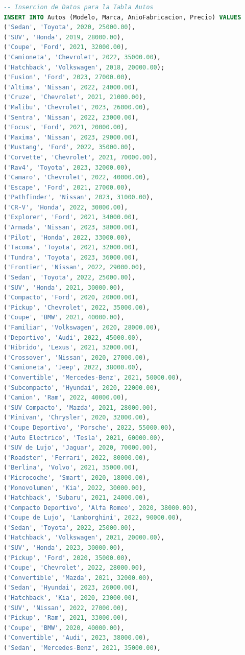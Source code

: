 \documentclass[12pt]{article}
\begin{document}
\begin{lstlisting}[language=SQL]
-- Insercion de Datos para la Tabla Autos
INSERT INTO Autos (Modelo, Marca, AnioFabricacion, Precio) VALUES
('Sedan', 'Toyota', 2020, 25000.00),
('SUV', 'Honda', 2019, 28000.00),
('Coupe', 'Ford', 2021, 32000.00),
('Camioneta', 'Chevrolet', 2022, 35000.00),
('Hatchback', 'Volkswagen', 2018, 20000.00);
('Fusion', 'Ford', 2023, 27000.00),
('Altima', 'Nissan', 2022, 24000.00),
('Cruze', 'Chevrolet', 2021, 21000.00),
('Malibu', 'Chevrolet', 2023, 26000.00),
('Sentra', 'Nissan', 2022, 23000.00),
('Focus', 'Ford', 2021, 20000.00),
('Maxima', 'Nissan', 2023, 29000.00),
('Mustang', 'Ford', 2022, 35000.00),
('Corvette', 'Chevrolet', 2021, 70000.00),
('Rav4', 'Toyota', 2023, 32000.00),
('Camaro', 'Chevrolet', 2022, 40000.00),
('Escape', 'Ford', 2021, 27000.00),
('Pathfinder', 'Nissan', 2023, 31000.00),
('CR-V', 'Honda', 2022, 30000.00),
('Explorer', 'Ford', 2021, 34000.00),
('Armada', 'Nissan', 2023, 38000.00),
('Pilot', 'Honda', 2022, 33000.00),
('Tacoma', 'Toyota', 2021, 32000.00),
('Tundra', 'Toyota', 2023, 36000.00),
('Frontier', 'Nissan', 2022, 29000.00),
('Sedan', 'Toyota', 2022, 25000.00),
('SUV', 'Honda', 2021, 30000.00),
('Compacto', 'Ford', 2020, 20000.00),
('Pickup', 'Chevrolet', 2022, 35000.00),
('Coupe', 'BMW', 2021, 40000.00),
('Familiar', 'Volkswagen', 2020, 28000.00),
('Deportivo', 'Audi', 2022, 45000.00),
('Hibrido', 'Lexus', 2021, 32000.00),
('Crossover', 'Nissan', 2020, 27000.00),
('Camioneta', 'Jeep', 2022, 38000.00),
('Convertible', 'Mercedes-Benz', 2021, 50000.00),
('Subcompacto', 'Hyundai', 2020, 22000.00),
('Camion', 'Ram', 2022, 40000.00),
('SUV Compacto', 'Mazda', 2021, 28000.00),
('Minivan', 'Chrysler', 2020, 32000.00),
('Coupe Deportivo', 'Porsche', 2022, 55000.00),
('Auto Electrico', 'Tesla', 2021, 60000.00),
('SUV de Lujo', 'Jaguar', 2020, 70000.00),
('Roadster', 'Ferrari', 2022, 80000.00),
('Berlina', 'Volvo', 2021, 35000.00),
('Microcoche', 'Smart', 2020, 18000.00),
('Monovolumen', 'Kia', 2022, 30000.00),
('Hatchback', 'Subaru', 2021, 24000.00),
('Compacto Deportivo', 'Alfa Romeo', 2020, 38000.00),
('Coupe de Lujo', 'Lamborghini', 2022, 90000.00),
('Sedan', 'Toyota', 2022, 25000.00),
('Hatchback', 'Volkswagen', 2021, 20000.00),
('SUV', 'Honda', 2023, 30000.00),
('Pickup', 'Ford', 2020, 35000.00),
('Coupe', 'Chevrolet', 2022, 28000.00),
('Convertible', 'Mazda', 2021, 32000.00),
('Sedan', 'Hyundai', 2023, 26000.00),
('Hatchback', 'Kia', 2020, 23000.00),
('SUV', 'Nissan', 2022, 27000.00),
('Pickup', 'Ram', 2021, 33000.00),
('Coupe', 'BMW', 2020, 40000.00),
('Convertible', 'Audi', 2023, 38000.00),
('Sedan', 'Mercedes-Benz', 2021, 35000.00),

\end{lstlisting}
\end{document}

